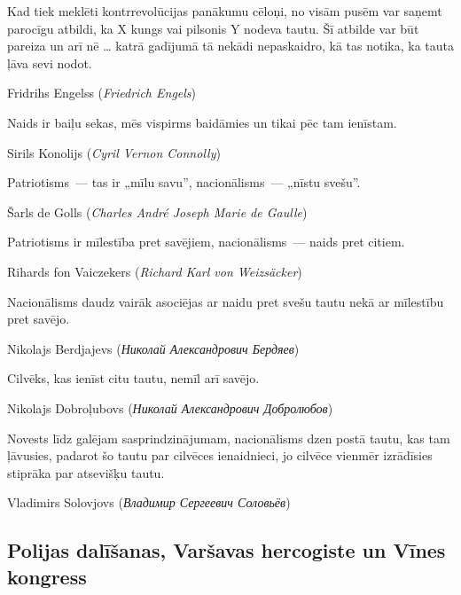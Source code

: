 \documentclass[twoside,a5paper,12pt,fleqn,openany]{extbook}
\newcommand{\rutxti}[1]{\textit{\textrussian{#1}}}
\newcommand{\detxti}[1]{\textit{\textgerman{#1}}}
\newcommand{\frtxti}[1]{\textit{\textfrench{#1}}}
\newcommand{\entxti}[1]{\textit{\textenglish{#1}}}
\begin{document}
\epigraph
{Kad tiek meklēti kontrrevolūcijas panākumu cēloņi, no visām pusēm var saņemt parocīgu atbildi, ka X kungs vai pilsonis Y nodeva tautu. Šī atbilde var būt pareiza un arī nē \dots{} katrā gadījumā tā nekādi nepaskaidro, kā tas notika, ka tauta ļāva sevi nodot.}
{Fridrihs Engelss (\detxti{Friedrich Engels})}

\epigraph
{Naids ir baiļu sekas, mēs vispirms baidāmies un tikai pēc tam ienīstam.}
{Sirils Konolijs (\entxti{Cyril Vernon Connolly})}

\newpage

\epigraph
{Patriotisms~--- tas ir „mīlu savu”, nacionālisms~--- „nīstu svešu”.}
{Šarls de Golls (\frtxti{Charles André Joseph Marie de Gaulle})}

\epigraph
{Patriotisms ir mīlestība pret savējiem, nacionālisms~--- naids pret citiem.}
{Rihards fon Vaiczekers (\detxti{Richard Karl von Weizsäcker})}

\epigraph
{Nacionālisms daudz vairāk asociējas ar naidu pret svešu tautu nekā ar mīlestību pret savējo.}
{Nikolajs Berdjajevs (\rutxti{Николай Александрович Бердяев})}

\epigraph
{Cilvēks, kas ienīst citu tautu, nemīl arī savējo.}
{Nikolajs Dobroļubovs (\rutxti{Николай Александрович Добролюбов})}

\epigraph
{Novests līdz galējam sasprindzinājumam, nacionālisms dzen postā tautu, kas tam ļāvusies, padarot šo tautu par cilvēces ienaidnieci, jo cilvēce vienmēr izrādīsies stiprāka par atsevišķu tautu.}
{Vladimirs Solovjovs (\rutxti{Владимир Сергеевич Соловьёв})}

\subsection{Polijas dalīšanas, Varšavas hercogiste un Vīnes kongress}
\end{document}
